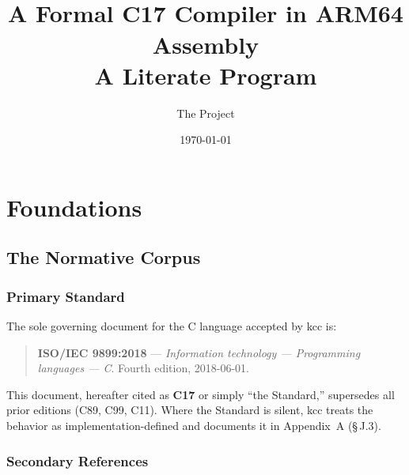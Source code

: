 \documentclass[11pt,a4paper,twoside,openright,DIV=15]{scrbook}
\title{\kcc\\[0.5em]
  \Large A Formal C17 Compiler in ARM64 Assembly\\[0.3em]
  \large A Literate Program}
\author{The \kcc{} Project}
\date{\today}
\theoremstyle{definition}
\theoremstyle{plain}
\theoremstyle{remark}
\newcommand{\stdref}[1]{\S\,#1}
\newcommand{\kcc}{\textsf{kcc}}
\begin{document}
\maketitle
\tableofcontents

\raggedbottom

\makeatletter
\newcommand{\forwardlabel}[1]{\immediate\write\@auxout{\string\newlabel{#1}{{??}{??}{}{}{}}}}
\makeatother
\part{Foundations}

%

\chapter{The Normative Corpus}
\label{ch:normative-corpus}

\section{Primary Standard}

The sole governing document for the C language accepted by \kcc{} is:

\begin{quote}
\textbf{ISO/IEC 9899:2018} --- \emph{Information technology ---
Programming languages --- C}.  Fourth edition, 2018-06-01.
\end{quote}

This document, hereafter cited as \textbf{C17} or simply ``the Standard,''
supersedes all prior editions (C89, C99, C11).  Where the Standard is
silent, \kcc{} treats the behavior as implementation-defined and documents
it in Appendix~A (\stdref{J.3}).

\section{Secondary References}
\end{document}
